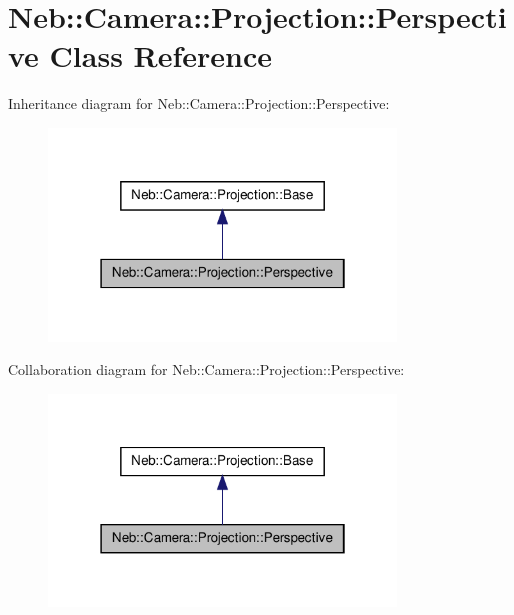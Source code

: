 \hypertarget{classNeb_1_1Camera_1_1Projection_1_1Perspective}{\section{\-Neb\-:\-:\-Camera\-:\-:\-Projection\-:\-:\-Perspective \-Class \-Reference}
\label{classNeb_1_1Camera_1_1Projection_1_1Perspective}
}


\-Inheritance diagram for \-Neb\-:\-:\-Camera\-:\-:\-Projection\-:\-:\-Perspective\-:
\nopagebreak
\begin{figure}[H]
\begin{center}
\leavevmode
\includegraphics[width=262pt]{classNeb_1_1Camera_1_1Projection_1_1Perspective__inherit__graph}
\end{center}
\end{figure}


\-Collaboration diagram for \-Neb\-:\-:\-Camera\-:\-:\-Projection\-:\-:\-Perspective\-:
\nopagebreak
\begin{figure}[H]
\begin{center}
\leavevmode
\includegraphics[width=262pt]{classNeb_1_1Camera_1_1Projection_1_1Perspective__coll__graph}
\end{center}
\end{figure}
